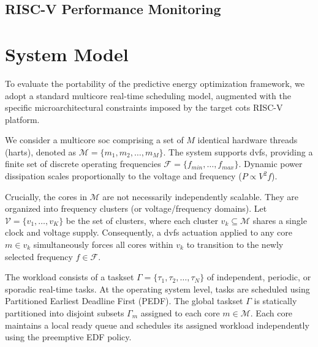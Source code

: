 \documentclass[conference]{IEEEtran}
\begin{document}
\subsection{RISC-V Performance Monitoring}

\section{System Model}\label{sec:system_model}
To evaluate the portability of the predictive energy optimization framework, we adopt a standard multicore real-time scheduling model, augmented with the specific microarchitectural constraints imposed by the target \gls{cots} RISC-V platform.

We consider a multicore \gls{soc} comprising a set of $M$ identical hardware threads (harts), denoted as $\mathcal{M} = \{m_1, m_2, \dots, m_M\}$. The system supports \gls{dvfs}, providing a finite set of discrete operating frequencies $\mathcal{F} = \{f_{min}, \dots, f_{max}\}$. Dynamic power dissipation scales proportionally to the voltage and frequency ($P \propto V^2f$). 

Crucially, the cores in $\mathcal{M}$ are not necessarily independently scalable. They are organized into frequency clusters (or voltage/frequency domains). Let $\mathcal{V} = \{v_1, \dots, v_K\}$ be the set of clusters, where each cluster $v_k \subseteq \mathcal{M}$ shares a single clock and voltage supply. Consequently, a \gls{dvfs} actuation applied to any core $m \in v_k$ simultaneously forces all cores within $v_k$ to transition to the newly selected frequency $f \in \mathcal{F}$.

The workload consists of a taskset $\Gamma = \{\tau_1, \tau_2, \dots, \tau_N\}$ of independent, periodic, or sporadic real-time tasks. At the operating system level, tasks are scheduled using Partitioned Earliest Deadline First (PEDF). The global taskset $\Gamma$ is statically partitioned into disjoint subsets $\Gamma_m$ assigned to each core $m \in \mathcal{M}$. Each core maintains a local ready queue and schedules its assigned workload independently using the preemptive EDF policy.
\end{document}
